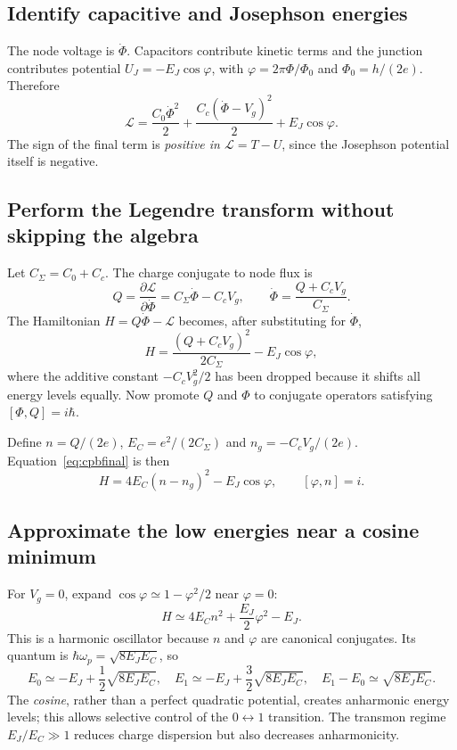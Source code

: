 \subsection{Identify capacitive and Josephson energies}
The node voltage is $\dot\Phi$. Capacitors contribute kinetic terms and the junction contributes potential $U_J=-E_J\cos\varphi$, with $\varphi=2\pi\Phi/\Phi_0$ and $\Phi_0=h/(2e)$. Therefore
\begin{equation}\label{eq:cpblag}
\boxed{\mathcal L=\frac{C_0\dot\Phi^2}{2}+\frac{C_c(\dot\Phi-V_g)^2}{2}+E_J\cos\varphi.}
\end{equation}
The sign of the final term is \emph{positive in $\mathcal L=T-U$}, since the Josephson potential itself is negative.

\subsection{Perform the Legendre transform without skipping the algebra}
Let $C_\Sigma=C_0+C_c$. The charge conjugate to node flux is
\begin{equation}
Q=\frac{\partial\mathcal L}{\partial\dot\Phi}=C_\Sigma\dot\Phi-C_cV_g,
\qquad \dot\Phi=\frac{Q+C_cV_g}{C_\Sigma}.
\end{equation}
The Hamiltonian $H=Q\dot\Phi-\mathcal L$ becomes, after substituting for $\dot\Phi$,
\begin{equation}
\boxed{H=\frac{(Q+C_cV_g)^2}{2C_\Sigma}-E_J\cos\varphi,}\label{eq:cpbfinal}
\end{equation}
where the additive constant $-C_cV_g^2/2$ has been dropped because it shifts all energy levels equally. Now promote $Q$ and $\Phi$ to conjugate operators satisfying $[\Phi,Q]=i\hbar$.

Define $n=Q/(2e)$, $E_C=e^2/(2C_\Sigma)$ and $n_g=-C_cV_g/(2e)$. Equation~\eqref{eq:cpbfinal} is then
\begin{equation}
\boxed{H=4E_C(n-n_g)^2-E_J\cos\varphi,\qquad [\varphi,n]=i.}
\end{equation}

\subsection{Approximate the low energies near a cosine minimum}
For $V_g=0$, expand $\cos\varphi\simeq1-\varphi^2/2$ near $\varphi=0$:
\begin{equation}
H\simeq 4E_Cn^2+\frac{E_J}{2}\varphi^2-E_J.
\end{equation}
This is a harmonic oscillator because $n$ and $\varphi$ are canonical conjugates. Its quantum is $\hbar\omega_p=\sqrt{8E_JE_C}$, so
\begin{equation}
\boxed{E_0\simeq -E_J+\frac12\sqrt{8E_JE_C},\quad
E_1\simeq -E_J+\frac32\sqrt{8E_JE_C},\quad
E_1-E_0\simeq\sqrt{8E_JE_C}.}
\end{equation}
The \emph{cosine}, rather than a perfect quadratic potential, creates anharmonic energy levels; this allows selective control of the $0\leftrightarrow1$ transition. The transmon regime $E_J/E_C\gg1$ reduces charge dispersion but also decreases anharmonicity.

